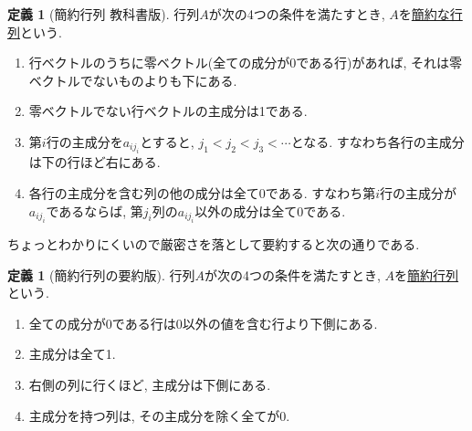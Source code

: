 \documentclass[dvipdfmx,a4paper,11pt]{article}
\theoremstyle{definition}
\newtheorem{dfn}[thm]{定義}
\begin{document}
 
\begin{tcolorbox}[
    colback = white,
    colframe = green!35!black,
    fonttitle = \bfseries,
    breakable = true]
    \begin{dfn}[簡約行列 教科書版]
  行列$A$が次の4つの条件を満たすとき, $A$を\underline{簡約な行列}という.
  \begin{enumerate}
    \setlength{\parskip}{0cm} 
  \setlength{\itemsep}{0cm}
\item 行ベクトルのうちに零ベクトル(全ての成分が0である行)があれば, それは零ベクトルでないものよりも下にある.
\item 零ベクトルでない行ベクトルの主成分は1である.
\item 第$i$行の主成分を$a_{ij_{i}}$とすると, $j_1<j_2<j_3<\cdots$となる. すなわち各行の主成分は下の行ほど右にある.
\item 各行の主成分を含む列の他の成分は全て0である. すなわち第$i$行の主成分が$a_{ij_{i}}$であるならば, 第$j_i$列の$a_{ij_{i}}$以外の成分は全て0である.
  \end{enumerate}
  \end{dfn}
 \end{tcolorbox}
 
 ちょっとわかりにくいので厳密さを落として要約すると次の通りである. 
 
 \begin{tcolorbox}[
    colback = white,
    colframe = green!35!black,
    fonttitle = \bfseries,
    breakable = true]
    \begin{dfn}[簡約行列の要約版]
  行列$A$が次の4つの条件を満たすとき, $A$を\underline{簡約行列}という.
  \begin{enumerate}
  	\setlength{\parskip}{0cm}
  	\setlength{\itemsep}{0pt} 
\item 全ての成分が0である行は0以外の値を含む行より下側にある. 
\item 主成分は全て1.
\item 右側の列に行くほど, 主成分は下側にある.
\item 主成分を持つ列は, その主成分を除く全てが0.
  \end{enumerate}
  \end{dfn}
 \end{tcolorbox}
 
 
 
\end{document}
